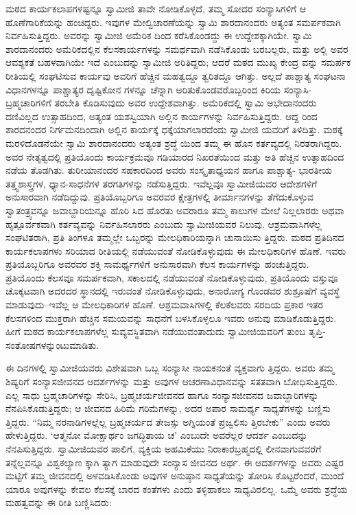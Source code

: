 ಮಠದ ಕಾರ್ಯಕಲಾಪಗಳಷ್ಟನ್ನೂ ಸ್ವಾಮೀಜಿ ತಾವೇ ನೋಡಿಕೊಳ್ಳದೆ, ತಮ್ಮ ಸೋದರ ಸಂನ್ಯಾಸಿಗಳಿಗೆ ಆ ಹೊಣೆಗಾರಿಕೆಯನ್ನು ಹಂಚಿದ್ದರು. ಇವುಗಳ ಮೇಲ್ವಿಚಾರಣೆಯನ್ನು ಸ್ವಾಮಿ ಶಾರದಾನಂದರು ಅತ್ಯಂತ ಸಮರ್ಪಕವಾಗಿ ನಿರ್ವಹಿಸುತ್ತಿದ್ದರು. ಅವರನ್ನು ಸ್ವಾಮೀಜಿ ಅಮೆರಿಕ ದಿಂದ ಕರೆಸಿಕೊಂಡದ್ದು ಈ ಉದ್ದೇಶಕ್ಕಾಗಿಯೇ. ಸ್ವಾಮಿ ಶಾರದಾನಂದರು ಅಮೆರಿಕದಲ್ಲಿನ ಕೆಲಸಕಾರ್ಯಗಳನ್ನು ಸಮರ್ಥವಾಗಿ ನಡೆಸಿಕೊಂಡು ಬರಬಲ್ಲರು, ಮತ್ತು ಅಲ್ಲಿ ಅವರ ಆವಶ್ಯಕತೆ ಬಹಳವಾಗಿಯೇ ಇದೆ ಎಂಬುದನ್ನು ಸ್ವಾಮೀಜಿ ಅರಿತಿದ್ದರು; ಆದರೆ ಮಠದ ಮುಖ್ಯ ಕೇಂದ್ರ ವನ್ನು ಸಮರ್ಪಕ ರೀತಿಯಲ್ಲಿ ಸಂಘಟಿಸುವ ಕಾರ್ಯವು ಅವರಿಗೆ ಹೆಚ್ಚಿನ ಮಹತ್ವದ್ದೂ ತ್ವರಿತದ್ದೂ ಆಗಿತ್ತು. ಅಲ್ಲದೆ ಪಾಶ್ಚಾತ್ಯ ಸಂಘಟನಾ ವಿಧಾನಗಳನ್ನೂ ಪಾಶ್ಚಾತ್ಯರ ದೃಷ್ಟಿಕೋನ ಗಳನ್ನೂ ಚೆನ್ನಾಗಿ ಅರಿತುಕೊಂಡವರೊಬ್ಬರಿಂದ ಕಿರಿಯ ಸಂನ್ಯಾಸಿ-ಬ್ರಹ್ಮಚಾರಿಗಳಿಗೆ ತರಬೇತಿ ಕೊಡಿಸುವುದು ಅವರ ಉದ್ದೇಶವಾಗಿತ್ತು. ಅಮೆರಿಕದಲ್ಲಿ ಸ್ವಾಮಿ ಅಭೇದಾನಂದರು ದಣಿವಿಲ್ಲದ ಉತ್ಸಾಹದಿಂದ, ಅತ್ಯಂತ ಯಶಸ್ವಿಯಾಗಿ ಅಲ್ಲಿನ ಕಾರ್ಯಗಳನ್ನು ನಿರ್ವಹಿಸುತ್ತಿದ್ದರು. ಆದ್ದ ರಿಂದ ಶಾರದನಂದರ ನಿರ್ಗಮನದಿಂದಾಗಿ ಅಲ್ಲಿನ ಕಾರ್ಯಕ್ಕೆ ಧಕ್ಕೆಯಾಗಲಾರದೆಂದು ಸ್ವಾಮೀಜಿ ಯವರಿಗೆ ತಿಳಿದಿತ್ತು. ಮಠಕ್ಕೆ ಮರಳಿದೊಡನೆಯೇ ಸ್ವಾಮಿ ಶಾರದಾನಂದರು ಅತ್ಯಂತ ಶ್ರದ್ಧೆ ಯಿಂದ ತಮ್ಮ ಈ ಹೊಸ ಕರ್ತವ್ಯದಲ್ಲಿ ನಿರತರಾಗಿದ್ದರು. ಅವರ ನೇತೃತ್ವದಲ್ಲಿ ಪ್ರತಿಯೊಂದು ಕಾರ್ಯಕ್ರಮವೂ ಗಡಿಯಾರದ ನಿಖರತೆಯಿಂದ ಮತ್ತು ಅತಿ ಹೆಚ್ಚಿನ ಉತ್ಸಾಹದಿಂದ ನಡೆಯ ತೊಡಗಿತು. ತುರೀಯಾನಂದರ ಸಹಕಾರದಿಂದ ಅವರು ಸಂಸ್ಕೃತಾಧ್ಯಯನ ಹಾಗೂ ಪಾಶ್ಚಾತ್ಯ- ಭಾರತೀಯ ತತ್ತ್ವಶಾಸ್ತ್ರಗಳ, ಧ್ಯಾನ-ಸಾಧನೆಗಳ ತರಗತಿಗಳನ್ನು ನಡೆಸುತ್ತಿದ್ದರು. ಇವೆಲ್ಲವೂ ಸ್ವಾಮೀಜಿಯವರ ಆದೇಶಗಳಿಗೆ ಅನುಸಾರವಾಗಿ ನಡೆದಿದ್ದುವು. ಪ್ರತಿಯೊಬ್ಬರಿಗೂ ಅವರವರ ಕ್ಷೇತ್ರಗಳಲ್ಲಿ ತೀರ್ಮಾನಗಳನ್ನು ತೆಗೆದುಕೊಳ್ಳುವ ಸ್ವಾತಂತ್ರ್ಯವನ್ನೂ ಜವಾಬ್ದಾರಿಯನ್ನೂ ಹೊರಿ ಸಿದ ಹೊರತು ಅವರಾರೂ ತಮ್ಮ ಕಾಲುಗಳ ಮೇಲೆ ನಿಲ್ಲಲಾರರು ಅಥವಾ ಹೃತ್ಪೂರ್ವಕವಾಗಿ ಕರ್ತವ್ಯವನ್ನು ನಿರ್ವಹಿಸಲಾರರು ಎಂಬುದು ಸ್ವಾಮೀಜಿಯವರ ನಿಲುವು. ಆಶ್ರಮವಾಸಿಗಳೆಲ್ಲ ಸಂಘಟಿತರಾಗಿ, ಪ್ರತಿ ತಿಂಗಳೂ ತಮ್ಮಲ್ಲೇ ಒಬ್ಬರನ್ನು ಮೇಲಧಿಕಾರಿಯನ್ನಾಗಿ ಚುನಾಯಿಸು ತ್ತಿದ್ದರು. ಮಠದ ಪ್ರತಿದಿನದ ಕಾರ್ಯಕಲಾಪಗಳು ಸರಿಯಾದ ರೀತಿಯಲ್ಲಿ ನಡೆಯುವಂತೆ ನೋಡಿಕೊಳ್ಳುವುದು ಈ ಮೇಲಧಿಕಾರಿಗಳ ಹೊಣೆ. ಇವರು ಪ್ರತಿಯೊಬ್ಬರಿಗೂ ಅವರವರ ಶಕ್ತಿ ಸಾಮರ್ಥ್ಯಗಳಿಗೆ ಅನುಸಾರವಾಗಿ ಕೆಲಸ ಕಾರ್ಯಗಳನ್ನು ಹಂಚುತ್ತಿದ್ದರು. ಪ್ರತಿಯೊಂದು ಕೆಲಸವೂ ಸಮರ್ಪಕವಾಗಿ, ಸಕಾಲದಲ್ಲಿ ನಡೆಯುವಂತೆ ನೋಡಿಕೊಳ್ಳುವುದು, ಪ್ರತಿಯೊಂದು ವಸ್ತುವೂ ಚೊಕ್ಕಟವಾಗಿ ಅದರದರ ಸ್ಥಾನದಲ್ಲಿ ಇರುವಂತೆ ನೋಡಿಕೊಳ್ಳುವುದು, ಅನಾರೋಗ್ಯ ಗೊಂಡವರ ಶುಶ್ರೂಷೆಗೆ ವ್ಯವಸ್ಥೆ ಮಾಡುವುದು–ಇವೆಲ್ಲ ಆ ಮೇಲಧಿಕಾರಿಗಳ ಹೊಣೆ. ಆಶ್ರಮವಾಸಿಗಳಲ್ಲಿ ಕೆಲಕೆಲವರು ಸರದಿಯ ಪ್ರಕಾರ ಇತರ ಕೆಲಸಗಳಿಂದ ಮುಕ್ತರಾಗಿ ಹೆಚ್ಚಿನ ಸಮಯವನ್ನು ಸಾಧನೆಗೆ ಬಳಸಿಕೊಳ್ಳಲೂ ಇವರು ಅನುವು ಮಾಡಿಕೊಡುತ್ತಿದ್ದರು. ಹೀಗೆ ಮಠದ ಕಾರ್ಯಕಲಾಪಗಳೆಲ್ಲ ಸುವ್ಯವಸ್ಥಿತವಾಗಿ ನಡೆಯುವಂತಾದುದು ಸ್ವಾಮೀಜಿಯವರಿಗೆ ತುಂಬ ತೃಪ್ತಿ-ಸಂತೋಷಗಳನ್ನುಂಟುಮಾಡಿತು.

ಈ ದಿನಗಳಲ್ಲಿ ಸ್ವಾಮೀಜಿಯವರು ವಿಶೇಷವಾಗಿ ಒಬ್ಬ ಸಂನ್ಯಾಸೀ ನಾಯಕನಂತೆ ವ್ಯಕ್ತವಾಗು ತ್ತಿದ್ದರು. ಅವರು ತಮ್ಮ ಶಿಷ್ಯರಿಗೆ ಸಂನ್ಯಾಸಜೀವನದ ಆದರ್ಶಗಳನ್ನು ಮತ್ತು ಅವುಗಳ ಆಚರಣಾವಿಧಾನವನ್ನು ಸತತವಾಗಿ ಬೋಧಿಸುತ್ತಿದ್ದರು. ಎಲ್ಲ ಸಾಧು ಬ್ರಹ್ಮಚಾರಿಗಳನ್ನು ಸೇರಿಸಿ, ಬ್ರಹ್ಮಚರ್ಯಜೀವನದ ಹಾಗೂ ಸಂನ್ಯಾಸಜೀವನದ ಜವಾಬ್ದಾರಿಗಳನ್ನು ನೆನಪಿಸಿಕೊಡುತ್ತಿದ್ದರು; ಆ ಜೀವನದ ಹಿರಿಮೆ ಗರಿಮೆಗಳನ್ನು, ಅದರ ಅಪಾರ ಸಾಮರ್ಥ್ಯ ಸಾಧ್ಯತೆಗಳನ್ನು ಬಣ್ಣಿಸು ತ್ತಿದ್ದರು. “ನಿಮ್ಮ ನರನಾಡಿಗಳಲ್ಲೆಲ್ಲ ಬ್ರಹ್ಮಚರ್ಯದ ತೇಜಸ್ಸು ಅಗ್ನಿಯಂತೆ ಪ್ರಜ್ವಲಿಸು ತ್ತಿರಬೇಕು” ಎಂದು ಅವರು ಹೇಳುತ್ತಿದ್ದರು. ‘ಆತ್ಮನೋ ಮೋಕ್ಷಾರ್ಥಂ ಜಗದ್ಧಿತಾಯ ಚ’ ಎಂಬುದೇ ಅವರೆಲ್ಲರ ಆದರ್ಶ ಎಂಬುದನ್ನು ನೆನಪಿಸುತ್ತಿದ್ದರು. ಸ್ವಾಮೀಜಿಯವರ ಪಾಲಿಗೆ, ವ್ಯಕ್ತಿಯ ಅಹಮಿಕೆಯು ನಿರಾಕಾರಬ್ರಹ್ಮದಲ್ಲಿ ಲೀನವಾಗುವವರೆಗೆ ತನ್ನೆಲ್ಲವನ್ನೂ ವಿಶ್ವಕಲ್ಯಾಣ ಕ್ಕಾಗಿ ತ್ಯಾಗ ಮಾಡುವುದೇ ಸಂನ್ಯಾಸ ಜೀವನದ ಅರ್ಥ. ಈ ಆದರ್ಶಗಳನ್ನು ಅವರು ಎಷ್ಟರ ಮಟ್ಟಿಗೆ ತಮ್ಮ ಜೀವನದಲ್ಲಿ ಅಳವಡಿಸಿಕೊಂಡು ಅವುಗಳ ಅನುಷ್ಠಾನ ಸಾಧ್ಯತೆಯನ್ನು ತೋರಿಸಿ ಕೊಟ್ಟರೆಂದರೆ, ಮುಂದೆ ಯಾರೂ ಅವುಗಳನ್ನು ಕೇವಲ ಕೆಲಸಕ್ಕೆ ಬಾರದ ಕಂತೆಗಳು ಎಂದು ತಳ್ಳಿಹಾಕಲು ಸಾಧ್ಯವಿರಲಿಲ್ಲ. ಒಮ್ಮೆ ಅವರು ಶ್ರದ್ಧೆಯ ಮಹತ್ವವನ್ನು ಈ ರೀತಿ ಬಣ್ಣಿಸಿದರು:

